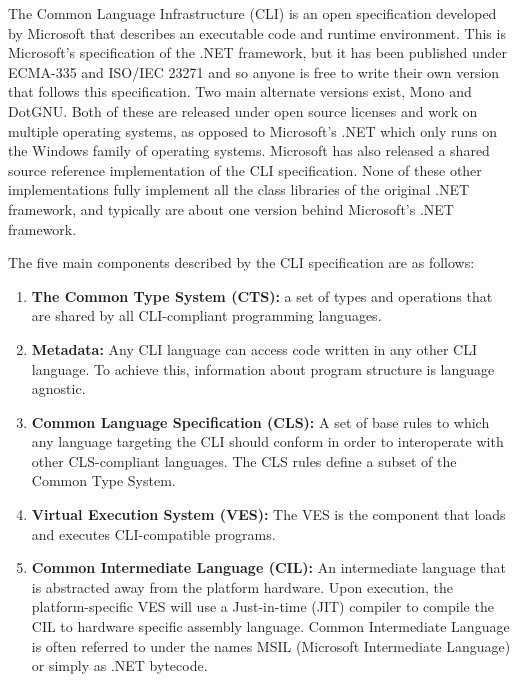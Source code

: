 	The Common Language Infrastructure (CLI) is an open specification developed by
	Microsoft that describes an executable code and runtime environment. This is 
	Microsoft's specification of the .NET framework, but it has been published 
	under ECMA-335 and ISO/IEC 23271 and so anyone is free to write their own 
	version that follows this specification. Two main alternate versions exist, 
	Mono and DotGNU. Both of these are released under open source licenses and 
	work on multiple operating systems, as opposed to Microsoft's .NET which only 
	runs on the Windows family of operating systems. Microsoft has also released a 
	shared source reference implementation of the CLI specification. None of these 
	other implementations fully implement all the class libraries of the original 
	.NET framework, and typically are about one version behind Microsoft's .NET 
	framework.

	The five main components described by the CLI specification are as follows:

	\begin{enumerate}
		
		\item \textbf{The Common Type System (CTS):} a set of types and operations 
		that are shared by all CLI-compliant programming languages.
		
		\item \textbf{Metadata:} Any CLI language can access code written in any 
		other CLI language. To achieve this, information about program structure is 
		language agnostic.
	
		\item \textbf{Common Language Specification (CLS):} A set of base rules to 
		which any language targeting the CLI should conform in order to interoperate 
		with other CLS-compliant languages. The CLS rules define a subset of the 
		Common Type System.
	
		\item \textbf{Virtual Execution System (VES):} The VES is the component that
		loads and executes CLI-compatible programs. 
	
		\item \textbf{Common Intermediate Language (CIL):} An intermediate language 
		that is abstracted away from the platform hardware. Upon execution, the 
		platform-specific VES will use a Just-in-time (JIT) compiler to compile the 
		CIL to hardware specific assembly language. Common Intermediate Language is 
		often referred to under the names MSIL (Microsoft Intermediate Language) or 
		simply as .NET bytecode.

	\end{enumerate}
    
